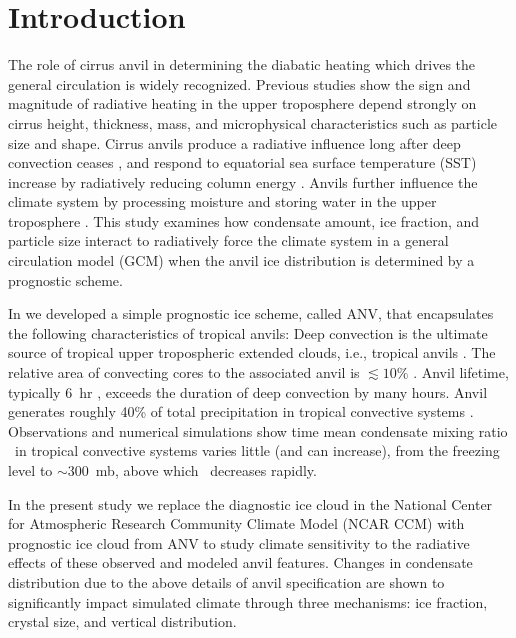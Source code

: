 \documentclass[agums]{aguplus}
\begin{document}
\ifphdcsz{}{\end{abstract}}

\section{Introduction}\label{sec:gcm_intro}

The role of cirrus anvil in determining the diabatic heating which
drives the general circulation is widely recognized.
Previous studies \cite[e.g.,][]{WeS80,ALV88,RaR891} show the sign and
magnitude of radiative heating in the upper troposphere depend
strongly on cirrus height, thickness, mass, and microphysical
characteristics such as particle size and shape. 
Cirrus anvils produce a radiative influence long after deep convection
ceases \cite[]{ALV88}, and respond to equatorial sea surface
temperature (SST) increase by radiatively reducing column energy
\cite[]{RaC91}. 
Anvils further influence the climate system by processing moisture 
\cite[]{LeH80} and storing water in the upper troposphere
\cite[]{SuL931}.  
This study examines how condensate amount, ice fraction, and particle
size interact to radiatively force the climate system in a general
circulation model (GCM) when the anvil ice distribution is determined
by a prognostic scheme.


In \cite{ZeK961} we developed a simple prognostic ice scheme, called
ANV, that encapsulates the following characteristics of tropical
anvils:
Deep convection is the ultimate source of tropical upper tropospheric
extended clouds, i.e., tropical anvils \cite[e.g.,][]{WeS80}. 
The relative area of convecting cores to the associated anvil is
$\lesssim 10\%$ \cite[]{FDR90}.
Anvil lifetime, typically 6~hr \cite[]{ALV88}, exceeds the duration 
of deep convection by many hours.
Anvil generates roughly 40\% of total precipitation in tropical
convective systems \cite[]{GaH83}. 
Observations and numerical simulations
\cite[e.g.,][]{WSS931,SLT94,GMK95} show time mean condensate mixing
ratio \qc\ in tropical convective systems varies little (and can
increase), from the freezing level to $\sim 300$~mb, above which \qc\
decreases rapidly.  

In the present study we replace the diagnostic ice cloud in the 
National Center for Atmospheric Research Community Climate Model (NCAR
CCM) with prognostic ice cloud from ANV to study climate sensitivity
to the radiative effects of these observed and modeled anvil features. 
Changes in condensate distribution due to the above details of anvil
specification are shown to significantly impact simulated climate
through three mechanisms: ice fraction, crystal size, and vertical
distribution. 
\end{document}
